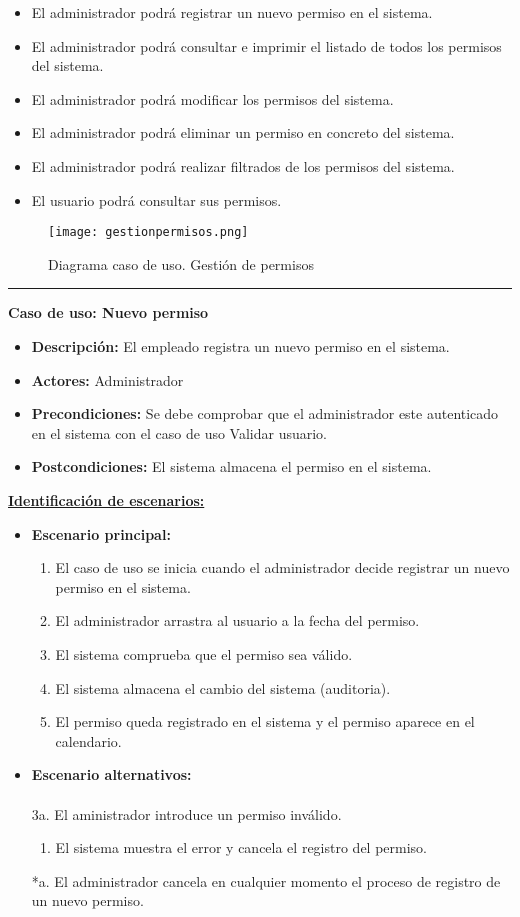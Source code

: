 \begin{itemize}
 \item El administrador podrá registrar un nuevo permiso en el sistema.
 \item El administrador podrá consultar e imprimir el listado de todos los permisos del sistema.
 \item El administrador podrá modificar los permisos del sistema.
 \item El administrador podrá eliminar un permiso en concreto del sistema.
 \item El administrador podrá realizar filtrados de los permisos del sistema.
 \item El usuario podrá consultar sus permisos.
\end{itemize}
\begin{figure}[H]
  \centering
    \texttt{[image: gestionpermisos.png]}
  \caption{Diagrama caso de uso. Gestión de permisos}
  \label{cu1}
\end{figure}
\smallskip
\hrule height 1pt
\smallskip
\textbf{Caso de uso: Nuevo permiso}
\begin{itemize}\renewcommand{\labelitemi}{$\cdot$}
 \item \textbf{Descripción:} El empleado registra un nuevo permiso en el sistema.
  \item \textbf{Actores:} Administrador 
  \item \textbf{Precondiciones:} Se debe comprobar que el administrador este autenticado en el sistema con el caso de uso Validar usuario.
  \item \textbf{Postcondiciones:} El sistema almacena el permiso en el sistema.
\end{itemize}
\underline{\textbf{Identificación de escenarios:}}
\begin{itemize}\renewcommand{\labelitemi}{$\circ$}
 \item \textbf{Escenario principal:}
         \begin{enumerate}
          \item El caso de uso se inicia cuando el administrador decide registrar un nuevo permiso en el sistema.
          \item El administrador arrastra al usuario a la fecha del permiso.
	   \item El sistema comprueba que el permiso sea válido.
 	  \item El sistema almacena el cambio del sistema (auditoria).
          \item El permiso queda registrado en el sistema y el permiso aparece en el calendario.
         \end{enumerate}
  \item \textbf{Escenario alternativos:}\\\\
	3a. El aministrador introduce un permiso inválido.
		\begin{enumerate}
		 \item El sistema muestra el error y cancela el registro del permiso.
		\end{enumerate}
          *a. El administrador cancela en cualquier momento el proceso de registro de un nuevo permiso.
\end{itemize}

